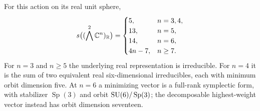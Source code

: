 \begin{theorem}\label{thm:exterior41}
For this action on its real unit sphere,
\begin{equation}\label{eq:exterior41}
 s\bigl((\bigwedge^2\mathbb C^n)_{\mathbb R}\bigr)=
 \begin{cases}
 5,&n=3,4,\\
 13,&n=5,\\
 14,&n=6,\\
 4n-7,&n\ge7.
 \end{cases}
\end{equation}
For $n=3$ and $n\ge5$ the underlying real representation is irreducible.
For $n=4$ it is the sum of two equivalent real six-dimensional
irreducibles, each with minimum orbit dimension five. At $n=6$ a
minimizing vector is a full-rank symplectic form, with stabilizer
$\operatorname{Sp}(3)$ and orbit $\operatorname{SU}(6)/\operatorname{Sp}(3)$;
the decomposable highest-weight vector instead has orbit dimension
seventeen.
\end{theorem}
